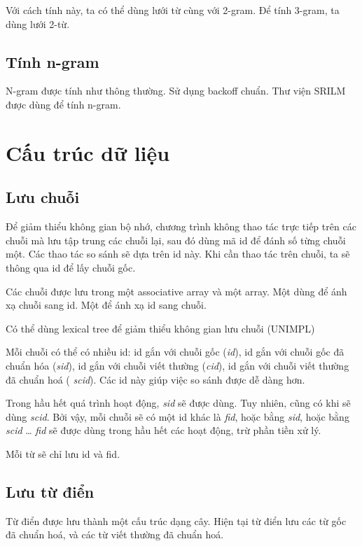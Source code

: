 \documentclass[a4paper,oneside]{book} %
\begin{document}
Với cách tính này, ta có thể dùng lưới từ cùng với 2-gram. Để tính
3-gram, ta dùng lưới 2-từ. 

\subsection{Tính n-gram}

N-gram được tính như thông thường. Sử dụng backoff chuẩn. Thư viện
SRILM được dùng để tính n-gram.



\section{Cấu trúc dữ liệu}


\subsection{Lưu chuỗi}

Để giảm thiểu không gian bộ nhớ, chương trình không thao tác trực tiếp
trên các chuỗi mà lưu tập trung các chuỗi lại, sau đó dùng mã id để
đánh số từng chuỗi một. Các thao tác so sánh sẽ dựa trên id này. Khi
cần thao tác trên chuỗi, ta sẽ thông qua id để lấy chuỗi gốc.

Các chuỗi được lưu trong một associative array và một array. Một dùng
để ánh xạ chuỗi sang id. Một để ánh xạ id sang chuỗi.

Có thể dùng lexical tree để giảm thiểu không gian lưu chuỗi (UNIMPL)

Mỗi chuỗi có thể có nhiều id: id gắn với chuỗi gốc ({\em id}), id gắn
với chuỗi gốc đã chuẩn hóa ({\em sid}), id gắn với chuỗi viết thường
({\em cid}), id  gắn với chuỗi viết thường đã chuẩn hoá ({\em
  scid}). Các id này giúp việc so sánh được dễ dàng hơn. 

Trong hầu hết quá trình hoạt động, {\em sid} sẽ được dùng. Tuy nhiên,
cũng có khi sẽ dùng {\em scid}. Bởi vậy, mỗi chuỗi sẽ có một id khác
là {\em fid}, hoặc bằng {\em sid}, hoặc bằng {\em scid} \ldots{} {\em
  fid} sẽ được dùng trong hầu hết các hoạt động, trừ phần tiền xử lý.

Mỗi từ sẽ chỉ lưu id và fid.

\subsection{Lưu từ điển}

Từ điển được lưu thành một cấu trúc dạng cây. Hiện tại từ điển lưu các
từ gốc đã chuẩn hoá, và các từ viết thường đã chuẩn hoá.
\end{document}
